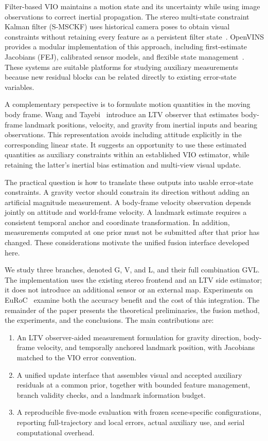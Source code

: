 \documentclass[a4paper,runningheads,twocolumn]{llncs}
\begin{document}
Filter-based VIO maintains a motion state and its uncertainty while using image observations to correct inertial propagation. The stereo multi-state constraint Kalman filter (S-MSCKF) uses historical camera poses to obtain visual constraints without retaining every feature as a persistent filter state~\cite{sun2018}. OpenVINS provides a modular implementation of this approach, including first-estimate Jacobians (FEJ), calibrated sensor models, and flexible state management~\cite{geneva2020}. These systems are suitable platforms for studying auxiliary measurements because new residual blocks can be related directly to existing error-state variables.

A complementary perspective is to formulate motion quantities in the moving body frame. Wang and Tayebi~\cite{wang2024} introduce an LTV observer that estimates body-frame landmark positions, velocity, and gravity from inertial inputs and bearing observations. This representation avoids including attitude explicitly in the corresponding linear state. It suggests an opportunity to use these estimated quantities as auxiliary constraints within an established VIO estimator, while retaining the latter's inertial bias estimation and multi-view visual update.

The practical question is how to translate these outputs into usable error-state constraints. A gravity vector should constrain its direction without adding an artificial magnitude measurement. A body-frame velocity observation depends jointly on attitude and world-frame velocity. A landmark estimate requires a consistent temporal anchor and coordinate transformation. In addition, measurements computed at one prior must not be submitted after that prior has changed. These considerations motivate the unified fusion interface developed here.

We study three branches, denoted G, V, and L, and their full combination GVL. The implementation uses the existing stereo frontend and an LTV side estimator; it does not introduce an additional sensor or an external map. Experiments on EuRoC~\cite{burri2016} examine both the accuracy benefit and the cost of this integration. The remainder of the paper presents the theoretical preliminaries, the fusion method, the experiments, and the conclusions. The main contributions are:
\begin{enumerate}
\item An LTV observer-aided measurement formulation for gravity direction, body-frame velocity, and temporally anchored landmark position, with Jacobians matched to the VIO error convention.
\item A unified update interface that assembles visual and accepted auxiliary residuals at a common prior, together with bounded feature management, branch validity checks, and a landmark information budget.
\item A reproducible five-mode evaluation with frozen scene-specific configurations, reporting full-trajectory and local errors, actual auxiliary use, and serial computational overhead.
\end{enumerate}
\end{document}
